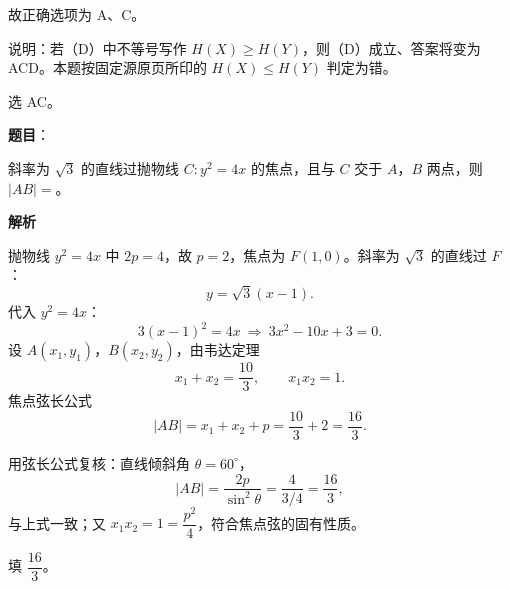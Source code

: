 \begin{answer}
故正确选项为 A、C。

\begin{gktip}
说明：若（D）中不等号写作 $H(X)\geqslant H(Y)$，则（D）成立、答案将变为 ACD。本题按固定源原页所印的 $H(X)\leqslant H(Y)$ 判定为错。
\end{gktip}

选 AC。


\end{answer}
\begin{answer}

\textbf{题目}：

斜率为 $\sqrt3$ 的直线过抛物线 $C:y^2=4x$ 的焦点，且与 $C$ 交于 $A$，$B$ 两点，则 $|AB|=$\gkblank{}。

\textbf{解析}

抛物线 $y^2=4x$ 中 $2p=4$，故 $p=2$，焦点为 $F(1,0)$。斜率为 $\sqrt3$ 的直线过 $F$：
\nopagebreak[4]
\[y=\sqrt3(x-1).\]
代入 $y^2=4x$：
\nopagebreak[4]
\[3(x-1)^2=4x\ \Longrightarrow\ 3x^2-10x+3=0 .\]
设 $A(x_1,y_1)$，$B(x_2,y_2)$，由韦达定理
\nopagebreak[4]
\[x_1+x_2=\frac{10}3,\qquad x_1x_2=1 .\]
焦点弦长公式
\nopagebreak[4]
\[|AB|=x_1+x_2+p=\frac{10}3+2=\frac{16}3 .\]

用弦长公式复核：直线倾斜角 $\theta=60^\circ$，
\nopagebreak[4]
\[|AB|=\frac{2p}{\sin^2\theta}=\frac4{3/4}=\frac{16}3,\]
与上式一致；又 $x_1x_2=1=\dfrac{p^2}4$，符合焦点弦的固有性质。

填 $\dfrac{16}3$。


\end{answer}
